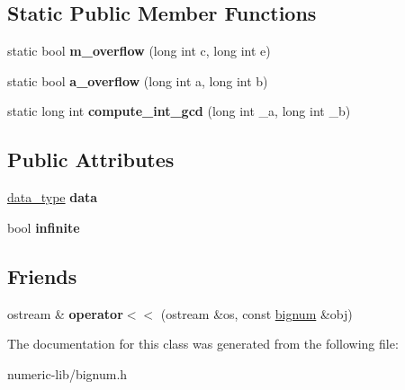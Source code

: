 \subsection*{\-Static \-Public \-Member \-Functions}
\begin{DoxyCompactItemize}
\item 
\hypertarget{classbignum_a0e4ab887ec8dd76faac83d3af7a7d612}{static bool {\bfseries m\-\_\-overflow} (long int c, long int e)}\label{classbignum_a0e4ab887ec8dd76faac83d3af7a7d612}

\item 
\hypertarget{classbignum_a839abc66d44ee477592c0e588809e016}{static bool {\bfseries a\-\_\-overflow} (long int a, long int b)}\label{classbignum_a839abc66d44ee477592c0e588809e016}

\item 
\hypertarget{classbignum_a6960ba802b03a16ba7f9a0df91ccaaa8}{static long int {\bfseries compute\-\_\-int\-\_\-gcd} (long int \-\_\-a, long int \-\_\-b)}\label{classbignum_a6960ba802b03a16ba7f9a0df91ccaaa8}

\end{DoxyCompactItemize}
\subsection*{\-Public \-Attributes}
\begin{DoxyCompactItemize}
\item 
\hypertarget{classbignum_a8da83f37b8c62026a3ebbf284ac7c991}{\hyperlink{uniondata__type}{data\-\_\-type} {\bfseries data}}\label{classbignum_a8da83f37b8c62026a3ebbf284ac7c991}

\item 
\hypertarget{classbignum_a4940ff4e92feaf5b4a1f0c6eb5a07832}{bool {\bfseries infinite}}\label{classbignum_a4940ff4e92feaf5b4a1f0c6eb5a07832}

\end{DoxyCompactItemize}
\subsection*{\-Friends}
\begin{DoxyCompactItemize}
\item 
\hypertarget{classbignum_a852b7ecc975dd7b8f6e9f293f65af0f6}{ostream \& {\bfseries operator$<$$<$} (ostream \&os, const \hyperlink{classbignum}{bignum} \&obj)}\label{classbignum_a852b7ecc975dd7b8f6e9f293f65af0f6}

\end{DoxyCompactItemize}


\-The documentation for this class was generated from the following file\-:\begin{DoxyCompactItemize}
\item 
numeric-\/lib/bignum.\-h\end{DoxyCompactItemize}
